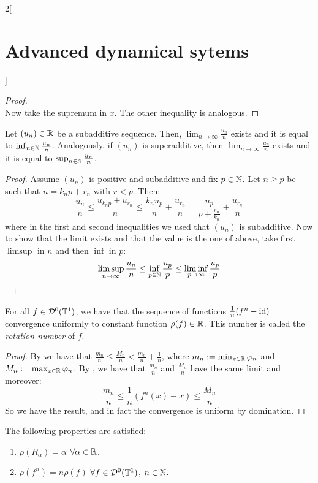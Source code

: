 \documentclass[../../../main_math.tex]{subfiles}
\begin{document}
\begin{multicols}{2}[\section{Advanced dynamical sytems}]
\begin{proof}
\begin{equation*}
    \end{equation*}
    Now take the supremum in $x$. The other inequality is analogous.
  \end{proof}
  \begin{lemma}\label{ADS:lema3}
    Let $(u_n)\in\mathbb{R}$ be a subadditive sequence. Then, $\displaystyle\lim_{n\to\infty}\frac{u_n}{n}$ exists and it is equal to $\inf_{n\in\mathbb{N}}\frac{u_n}{n}$. Analogously, if $(u_n)$ is superadditive, then $\displaystyle\lim_{n\to\infty}\frac{u_n}{n}$ exists and it is equal to $\sup_{n\in\mathbb{N}}\frac{u_n}{n}$.
  \end{lemma}
  \begin{proof}
    Assume $(u_n)$ is positive and subadditive and fix $p\in\mathbb{N}$. Let $n\geq p$ be such that $n=k_np+r_n$ with $r<p$. Then:
    $$
      \frac{u_n}{n}\leq \frac{u_{k_np}+u_{r_n}}{n}\leq \frac{k_nu_p}{n}+\frac{u_{r_n}}{n}=\frac{u_p}{p+\frac{r_n}{k_n}}+\frac{u_{r_n}}{n}
    $$
    where in the first and second inequalities we used that $(u_n)$ is subadditive. Now to show that the limit exists and that the value is the one of above, take first $\limsup$ in $n$ and then $\inf$ in $p$:
    $$
      \limsup_{n\to\infty}\frac{u_n}{n}\leq \inf_{p\in\mathbb{N}}\frac{u_p}{p}\leq \liminf_{p\to\infty}\frac{u_p}{p}
    $$
  \end{proof}
  \begin{theorem}
    For all $f\in \mathcal{D}^0(\mathbb{T}^1)$, we have that the sequence of functions $\frac{1}{n}(f^n-\mathrm{id})$ convergence uniformly to constant function $\rho(f)\in\mathbb{R}$. This number is called the \emph{rotation number} of $f$.
  \end{theorem}
  \begin{proof}
    By  we have that $\frac{m_n}{n}\leq \frac{M_n}{n}< \frac{m_n}{n}+\frac{1}{n}$, where $m_n:= \min_{x\in\mathbb{R}}\varphi_n$ and $M_n:= \max_{x\in\mathbb{R}}\varphi_n$. By , we have that $\frac{m_n}{n}$ and $\frac{M_n}{n}$ have the same limit and moreover:
    $$
      \frac{m_n}{n}\leq \frac{1}{n}(f^n(x)-x)\leq \frac{M_n}{n}
    $$
    So we have the result, and in fact the convergence is uniform by domination.
  \end{proof}
  \begin{proposition}
    The following properties are satisfied:
    \begin{enumerate}
      \item $\rho(R_\alpha)=\alpha$ $\forall\alpha\in\mathbb{R}$.
      \item $\rho(f^n)=n\rho(f)$ $\forall f\in \mathcal{D}^0(\mathbb{T}^1)$, $n\in\mathbb{N}$.

\end{enumerate}
\end{proposition}
\end{multicols}
\end{document}
